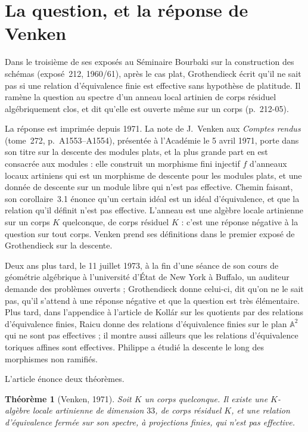 \documentclass[11pt,a4paper]{amsart}
\theoremstyle{definition}
\theoremstyle{plain}
\newtheorem*{theoreme}{Théorème}
\theoremstyle{remark}
\newcommand{\A}{\mathbb A}
\begin{document}
\section{La question, et la réponse de Venken}

Dans le troisième de ses exposés au Séminaire Bourbaki sur la construction des schémas (exposé~212, 1960/61), après le cas plat, Grothendieck écrit qu'il ne sait pas si une relation d'équivalence finie est effective sans hypothèse de platitude. Il ramène la question au spectre d'un anneau local artinien de corps résiduel algébriquement clos, et dit qu'elle est ouverte même sur un corps (p.~212-05).

La réponse est imprimée depuis 1971. La note de J.~Venken aux \emph{Comptes rendus} (tome~272, p.~A1553--A1554), présentée à l'Académie le 5 avril 1971, porte dans son titre sur la descente des modules plats, et la plus grande part en est consacrée aux modules : elle construit un morphisme fini injectif $f$ d'anneaux locaux artiniens qui est un morphisme de descente pour les modules plats, et une donnée de descente sur un module libre qui n'est pas effective. Chemin faisant, son corollaire~3.1 énonce qu'un certain idéal est un idéal d'équivalence, et que la relation qu'il définit n'est pas effective. L'anneau est une algèbre locale artinienne sur un corps $K$ quelconque, de corps résiduel $K$ : c'est une réponse négative à la question sur tout corps. Venken prend ses définitions dans le premier exposé de Grothendieck sur la descente.

Deux ans plus tard, le 11 juillet 1973, à la fin d'une séance de son cours de géométrie algébrique à l'université d'État de New York à Buffalo, un auditeur demande des problèmes ouverts ; Grothendieck donne celui-ci, dit qu'on ne le sait pas, qu'il s'attend à une réponse négative et que la question est très élémentaire. Plus tard, dans l'appendice à l'article de Kollár sur les quotients par des relations d'équivalence finies, Raicu donne des relations d'équivalence finies sur le plan $\A^2$ qui ne sont pas effectives ; il montre aussi ailleurs que les relations d'équivalence toriques affines sont effectives. Philippe a étudié la descente le long des morphismes non ramifiés.

L'article énonce deux théorèmes.

\begin{theoreme}[Venken, 1971]
Soit $K$ un corps quelconque. Il existe une $K$-algèbre locale artinienne de dimension $33$, de corps résiduel $K$, et une relation d'équivalence fermée sur son spectre, à projections finies, qui n'est pas effective.
\end{theoreme}
\end{document}
